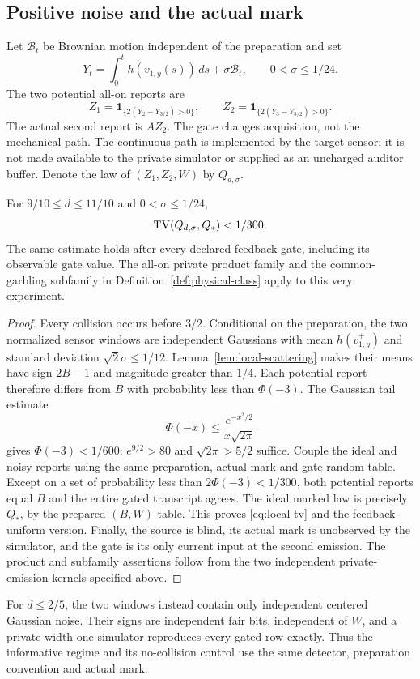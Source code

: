 \subsection{Positive noise and the actual mark}
Let $\mathcal B_t$ be Brownian motion independent of the preparation and
set
\[
 Y_t=\int_0^t h(v_{1,y}(s))\,ds+\sigma\mathcal B_t,
                  \qquad 0<\sigma\le1/24.
\]
The two potential all-on reports are
\[
 Z_1=\mathbf1_{\{2(Y_2-Y_{3/2})>0\}},\qquad
 Z_2=\mathbf1_{\{2(Y_3-Y_{5/2})>0\}}.
\]
The actual second report is $AZ_2$. The gate changes acquisition, not
the mechanical path. The continuous path is implemented by the target
sensor; it is not made available to the private simulator or supplied
as an uncharged auditor buffer. Denote the law of $(Z_1,Z_2,W)$ by
$Q_{d,\sigma}$.

\begin{theorem}\label{thm:local-physical}
For $9/10\le d\le11/10$ and $0<\sigma\le1/24$,
\begin{equation}\label{eq:local-tv}
                    \operatorname{TV}(Q_{d,\sigma},Q_*)<1/300.
\end{equation}
The same estimate holds after every declared feedback gate, including
its observable gate value. The all-on private product family and the
common-garbling subfamily in Definition~\ref{def:physical-class} apply
to this very experiment.
\end{theorem}
\begin{proof}
Every collision occurs before $3/2$. Conditional on the preparation,
the two normalized sensor windows are independent Gaussians with mean
$h(v_{1,y}^+)$ and standard deviation $\sqrt2\sigma\le1/12$.
Lemma~\ref{lem:local-scattering} makes their means have sign $2B-1$
and magnitude greater than $1/4$. Each potential report therefore
differs from $B$ with probability less than $\Phi(-3)$.
The Gaussian tail estimate
\[
 \Phi(-x)\le\frac{e^{-x^2/2}}{x\sqrt{2\pi}}
\]
gives $\Phi(-3)<1/600$: $e^{9/2}>80$ and $\sqrt{2\pi}>5/2$
suffice. Couple the ideal and noisy reports using the same preparation,
actual mark and gate random table. Except on a set of probability less
than $2\Phi(-3)<1/300$, both potential reports equal $B$ and the entire
gated transcript agrees. The ideal marked law is precisely $Q_*$,
by the prepared $(B,W)$ table. This proves \eqref{eq:local-tv} and the
feedback-uniform version. Finally, the source is blind, its actual mark
is unobserved by the simulator, and the gate is its only current input
at the second emission. The product and subfamily assertions follow
from the two independent private-emission kernels specified above.
\end{proof}

For $d\le2/5$, the two windows instead contain only independent centered
Gaussian noise. Their signs are independent fair bits, independent of
$W$, and a private width-one simulator reproduces every gated row
exactly. Thus the informative regime and its no-collision control use
the same detector, preparation convention and actual mark.
